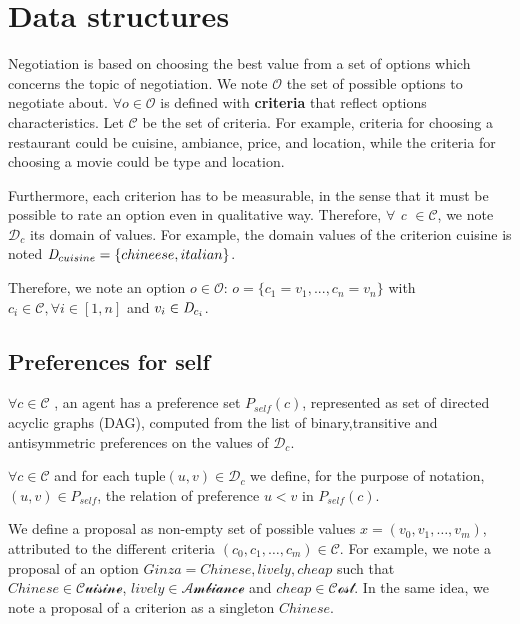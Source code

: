 \documentclass{article}
\begin{document}
		\title{\vskip -10pt}
		
		\author{Lydia Ould Ouali, Charles Rich \and
		Nicolas Sabouret }
		
	
	\section{Data structures}
	Negotiation is based on choosing the best value from a set of options which concerns the topic of negotiation. We note $\mathcal{O}$ the set of possible options to negotiate about. $\forall o \in \mathcal{O}$ is defined with \textbf{criteria} that reflect options characteristics.
	Let $\mathcal{C}$ be the set of criteria. For example, criteria for choosing a restaurant could be cuisine, ambiance, price, and location, while the criteria for choosing a movie could be type and location. 
	
	Furthermore, each criterion has to be measurable, in the sense that it must be possible to rate an option even in qualitative way. Therefore, $\forall$ \emph{c $\in\mathcal{ C}$},  we note $\mathcal{D}_c$ its  domain of values. For example, the domain  values of the criterion cuisine is noted $\emph{D}_{cuisine} = \{chineese, italian\}$.
	
	Therefore, we note an option $o\in \mathcal{O}$:
	$o = \{c_1=v_1,..., c_n=v_n\}$ with $c_i \in \mathcal{C}, \forall i \in [1,n]$ and $v_i\in \emph{D}_{c_i}$. 
	
	\subsection{Preferences for self}
	$\forall c \in \mathcal{C}$ , an agent has a preference set $P_{self}(c)$, represented as set of directed acyclic graphs (DAG), computed from the list of binary,transitive and antisymmetric preferences on the values of $\mathcal{D}_c$.
	
	$\forall c \in \mathcal{C}$ and for each tuple$ (u,v) \in \mathcal{D}_c$ we define, for the purpose of notation, $(u,v) \in P_{self}$, the relation of preference $u<v$ in  $P_{self}(c)$. 
	
	
	We define a proposal as non-empty set of possible values  $x=(v_0,v_1,\ldots,v_m)$, attributed to the different criteria  $(c_0,c_1,\ldots,c_m) \in \mathcal{C}$.
	For example, we note a proposal of an option $Ginza = Chinese, lively, cheap$ such that $Chinese \in \mathcal{Cuisine}$, $lively \in \mathcal{Ambiance}$ and $cheap \in \mathcal{Cost}$. In the same idea, we note a proposal of a criterion as a singleton $Chinese$.
	
\end{document}
